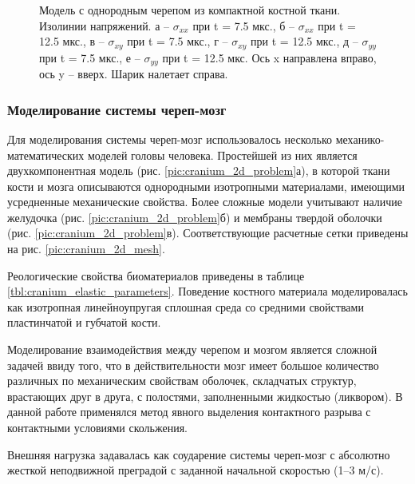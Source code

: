 \begin{figure}[h]
\begin{subfigure}[b]{0.13\textwidth}
\caption{ }
\end{subfigure}
\caption{Модель с однородным черепом из компактной костной ткани.  Изолинии напряжений. а -- $\sigma_{xx}$ при t = 7.5 мкс., б -- $\sigma_{xx}$ при t = 12.5 мкс., в -- $\sigma_{xy}$ при t = 7.5 мкс., г -- $\sigma_{xy}$ при t = 12.5 мкс., д -- $\sigma_{yy}$ при t = 7.5 мкс., е -- $\sigma_{yy}$ при t = 12.5 мкс. Ось x направлена вправо, ось y -- вверх. Шарик налетает справа.}
\label{pic:cranium_2d_simple_model}
\end{figure}

\clearpage
\newpage

\subsubsection{Моделирование системы череп-мозг}

Для моделирования системы череп-мозг использовалось несколько механико-математических моделей головы человека. Простейшей из них является двухкомпонентная модель (рис. \ref{pic:cranium_2d_problem}а), в которой ткани кости и мозга описываются однородными изотропными материалами, имеющими усредненные механические свойства. Более сложные модели учитывают наличие желудочка (рис. \ref{pic:cranium_2d_problem}б) и мембраны твердой оболочки (рис. \ref{pic:cranium_2d_problem}в). Соответствующие расчетные сетки приведены на рис. \ref{pic:cranium_2d_mesh}.

Реологические свойства биоматериалов приведены в таблице \ref{tbl:cranium_elastic_parameters}. Поведение костного материала моделировалась как изотропная линейноупругая сплошная среда со средними свойствами пластинчатой и губчатой кости.

Моделирование взаимодействия между черепом и мозгом является сложной задачей ввиду того, что в действительности мозг имеет большое количество различных по механическим свойствам оболочек, складчатых структур, врастающих друг в друга, с полостями, заполненными жидкостью (ликвором). В данной работе применялся метод явного выделения контактного разрыва с контактными условиями скольжения.

Внешняя нагрузка задавалась как соударение системы череп-мозг с абсолютно жесткой неподвижной преградой с заданной начальной скоростью (1--3 м/с).

